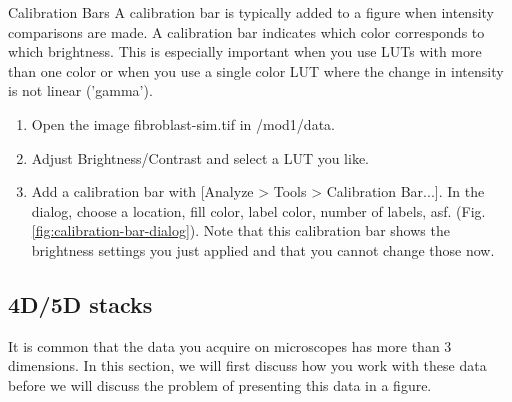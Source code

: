\newpage
\begin{taskbox}{Calibration Bars}
A calibration bar is typically added to a figure when intensity comparisons are made. A calibration bar indicates which color corresponds to which brightness. This is especially important when you use LUTs with more than one color or when you use a single color LUT where the change in intensity is not linear ('gamma').

\begin{enumerate}
	\item Open the image fibroblast-sim.tif in /mod1/data. 
	\item Adjust Brightness/Contrast and select a LUT you like.
	\item Add a calibration bar with [Analyze > Tools > Calibration Bar...]. In the dialog, choose a location, fill color, label color, number of labels, asf. (Fig. \ref{fig:calibration-bar-dialog}). Note that this calibration bar shows the brightness settings you just applied and that you cannot change those now.	
	
	\begin{minipage}[t]{\linewidth}
		\begin{center}
		\medskip
		\label{fig:calibration-bar-dialog}
		\end{center}
	\end{minipage}
	
\end{enumerate}

\end{taskbox}

\subsection{4D/5D stacks}
It is common that the data you acquire on microscopes has more than 3 dimensions. In this section, we will first discuss how you work with these data before we will discuss the problem of presenting this data in a figure.

